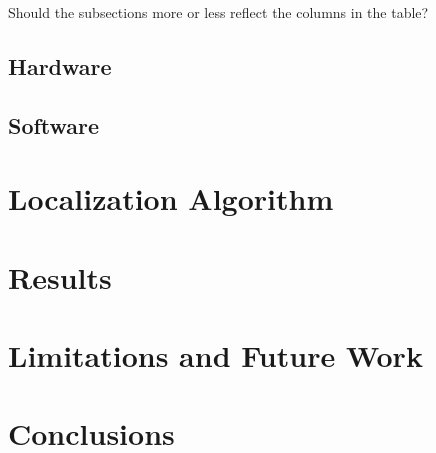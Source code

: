\documentclass[letterpaper, 10 pt, conference]{ieeeconf}  %
\begin{document}
Should the subsections more or less reflect the columns in the table?

\subsection{Hardware}

\subsection{Software}

\section{Localization Algorithm}

\section{Results}

\section{Limitations and Future Work}


\section{Conclusions}



\end{document}
